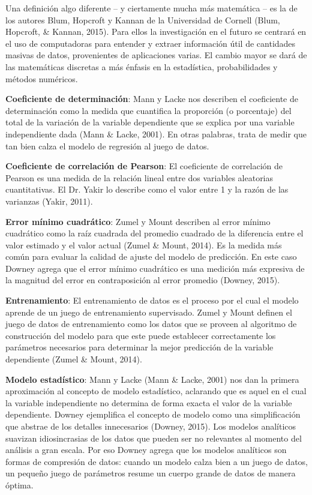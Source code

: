 Una definición algo diferente – y ciertamente mucha más matemática – es la de los autores Blum, Hopcroft y Kannan de la Universidad de Cornell (Blum, Hopcroft, \& Kannan, 2015). Para ellos la investigación en el futuro se centrará en el uso de computadoras para entender y extraer información útil de cantidades masivas de datos, provenientes de aplicaciones varias. El cambio mayor se dará de las matemáticas discretas a más énfasis en la estadística, probabilidades y métodos numéricos.
 
\textbf{Coeficiente de determinación}: Mann y Lacke nos describen el coeficiente de determinación como la medida que cuantifica la proporción (o porcentaje) del total de la variación de la variable dependiente que se explica por una variable independiente dada (Mann \& Lacke, 2001). En otras palabras, trata de medir que tan bien calza el modelo de regresión al juego de datos.
 
\textbf{Coeficiente de correlación de Pearson}: El coeficiente de correlación de Pearson es una medida de la relación lineal entre dos variables aleatorias cuantitativas. El Dr. Yakir lo describe como el valor entre 1 y la razón de las varianzas (Yakir, 2011).
 
\textbf{Error mínimo cuadrático}: Zumel y Mount describen al error mínimo cuadrático como la raíz cuadrada del promedio cuadrado de la diferencia entre el valor estimado y el valor actual (Zumel \& Mount, 2014). Es la medida más común para evaluar la calidad de ajuste del modelo de predicción. En este caso Downey agrega que el error mínimo cuadrático es una medición más expresiva de la magnitud del error en contraposición al error promedio (Downey, 2015).
 
\textbf{Entrenamiento}: El entrenamiento de datos es el proceso por el cual el modelo aprende de un juego de entrenamiento supervisado. Zumel y Mount definen el juego de datos de entrenamiento como los datos que se proveen al algoritmo de construcción del modelo para que este puede establecer correctamente los parámetros necesarios para determinar la mejor predicción de la variable dependiente (Zumel \& Mount, 2014).
 
\textbf{Modelo estadístico}: Mann y Lacke (Mann \& Lacke, 2001) nos dan la primera aproximación al concepto de modelo estadístico, aclarando que es aquel en el cual la variable independiente no determina de forma exacta el valor de la variable dependiente. Downey ejemplifica el concepto de modelo como una simplificación que abstrae de los detalles innecesarios (Downey, 2015). Los modelos analíticos suavizan idiosincrasias de los datos que pueden ser no relevantes al momento del análisis a gran escala. Por eso Downey agrega que los modelos analíticos son formas de compresión de datos: cuando un modelo calza bien a un juego de datos, un pequeño juego de parámetros resume un cuerpo grande de datos de manera óptima.
 
